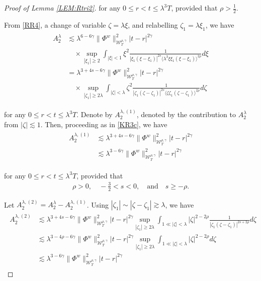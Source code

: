 \documentclass[letterpaper, 11pt,  reqno]{amsart}
\DeclareMathOperator*{\intt}{\int}
\newcommand{\1}{\hspace{0.5mm}\text{I}\hspace{0.5mm}}
\newcommand{\noi}{\noindent}
\newcommand{\g}{\gamma}
\newcommand{\ld}{\lambda}
\newcommand{\les}{\lesssim}
\newcommand{\ges}{\gtrsim}
\newcommand{\jb}[1]
{\langle #1 \rangle}
\newcommand{\W}{\mathcal{W}}
\newcommand{\z}{\zeta}
\numberwithin{equation}{section}
\numberwithin{theorem}{section}
\begin{document}
\begin{proof}[Proof of Lemma \ref{LEM:Rtri2}]
\noi
for any $0 \le r < t \le \ld^3T$, 
provided that  $\rho > \frac 12$.



From  \eqref{RR4}, 
 a change of variable $\z = \ld \xi$, 
and relabelling $\z_1 = \ld \xi_1$, 
 we have 
\begin{align}
\begin{split}
A^\ld_2 
& \les 
 \ld^{6 -6\g} 
 \|\Phi^{w}  \|_{\W_{T}^{\rho, \g}}^2
 |t-r|^{2\g} \\
 & 
 \quad 
 \times 
\sup_{|\xi_1|\ge 2}
\intt_{|\xi|< 1}
\xi^2
\frac{1}
{|\xi_1(\xi - \xi_1)|^{2s}\jb{\ld^3 \xi \xi_1 (\xi-\xi_1)}^{2\rho}} d\xi\\
& = 
 \ld^{3+4s -6\g} 
 \|\Phi^{w}  \|_{\W_{T}^{\rho, \g}}^2
 |t-r|^{2\g} \\
  & 
 \quad 
 \times 
\sup_{|\z_1|\ge 2\ld}
\intt_{|\z|< \ld}
\z^2
\frac1 
{|\z_1(\z - \z_1)|^{2s}\jb{\z\z_1(\z-\z_1)}^{2\rho}} d\z
\end{split}
\label{RR7}
\end{align}

\noi
for any $0 \le r < t \le \ld^3T$.
Denote by $A_2^{\ld, (1)}$, denoted by 
the contribution to $A^\ld_2$ from $|\z|\les 1$.
Then, 
proceeding as in \eqref{KR3c}, 
we have
\begin{align}
\begin{split}
A^{\ld, (1)}_2 
& \les  \ld^{3 + 4s -6\g} 
 \|\Phi^{w}  \|_{\W_{T}^{\rho, \g}}^2
 |t-r|^{2\g}\\
& \les  \ld^{3  -6\g} 
 \|\Phi^{w}  \|_{\W_{T}^{\rho, \g}}^2
 |t-r|^{2\g}
 \end{split}
\label{RR8}
\end{align}


\noi
for any $0 \le r < t \le \ld^3T$, 
provided that 
\begin{align*}
\rho > 0, \quad   -\frac 32 < s < 0, 
\quad \text{and} \quad  
s\ge -\rho.
\end{align*}

\noi
Let $A_2^{\ld, (2)} = A_2^{\ld}- A_2^{\ld, (1)}$.
Using $|\z_1| \sim |\z - \z_1|\ges \ld$, we have 
\begin{align}
\begin{split}
A^{\ld, (2)}_2 
& \les 
 \ld^{3 + 4s -6\g} 
 \|\Phi^{w}  \|_{\W_{T}^{\rho, \g}}^2
 |t-r|^{2\g} 
\sup_{|\z_1|\ge 2\ld}
\intt_{1\ll |\z|< \ld}
|\z|^{2- 2\rho}
\frac1 
{|\z_1(\z - \z_1)|^{2s+ 2\rho}} d\z\\
& \les 
 \ld^{3 -4\rho  -6\g} 
 \|\Phi^{w}  \|_{\W_{T}^{\rho, \g}}^2
 |t-r|^{2\g} 
\sup_{|\z_1|\ge 2\ld}
\intt_{1\ll |\z|< \ld}
|\z|^{2- 2\rho}
d\z\\
& \les  \ld^{3  -6\g} 
 \|\Phi^{w}  \|_{\W_{T}^{\rho, \g}}^2
 |t-r|^{2\g}
\end{split}
\label{RR10}
\end{align}



\end{proof}
\end{document}
